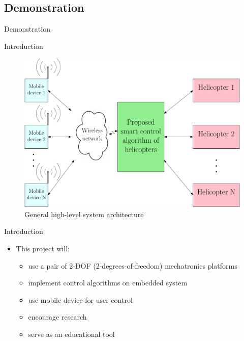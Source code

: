 \documentclass{beamer}
\begin{document}
\subsection*{Demonstration}

\begin{frame}{Demonstration}
    \centering
\end{frame}


\begin{frame}{Introduction}{}
\begin{figure}
  \centering
  \includegraphics[scale=0.31]{figs/ipe/highLevel_wht_grn}
  \caption{General high-level system architecture}
  \label{fig:ProblemStatementImage}
\end{figure}
\end{frame}

\begin{frame}{Introduction}{}
        \begin{itemize}
        \item This project will:
            \begin{itemize}
                \item use a pair of 2-DOF (2-degrees-of-freedom) mechatronics platforms
                \item implement control algorithms on embedded system
                \item use mobile device for user control
                \item encourage research
                \item serve as an educational tool
            \end{itemize}
        \end{itemize}
\end{frame}
\end{document}
